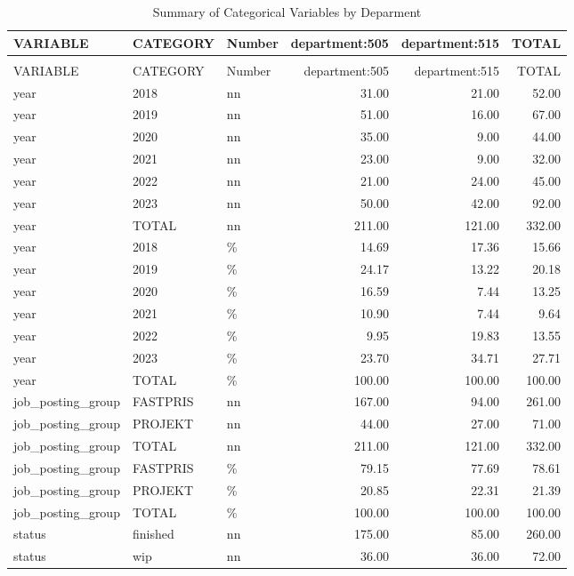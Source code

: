 \begingroup\fontsize{9}{11}\selectfont

\begin{longtable}[t]{lllrrr}
\caption{Summary of Categorical Variables by Deparment}\\
\toprule
VARIABLE & CATEGORY & Number & department:505 & department:515 & TOTAL\\
\midrule
\endfirsthead
\caption[]{Summary of Categorical Variables by Deparment }\\
\toprule
VARIABLE & CATEGORY & Number & department:505 & department:515 & TOTAL\\
\midrule
\endhead

\endfoot
\bottomrule
\endlastfoot
year & 2018 & nn & 31.00 & 21.00 & 52.00\\
year & 2019 & nn & 51.00 & 16.00 & 67.00\\
year & 2020 & nn & 35.00 & 9.00 & 44.00\\
year & 2021 & nn & 23.00 & 9.00 & 32.00\\
year & 2022 & nn & 21.00 & 24.00 & 45.00\\
year & 2023 & nn & 50.00 & 42.00 & 92.00\\
year & TOTAL & nn & 211.00 & 121.00 & 332.00\\
year & 2018 & \% & 14.69 & 17.36 & 15.66\\
year & 2019 & \% & 24.17 & 13.22 & 20.18\\
year & 2020 & \% & 16.59 & 7.44 & 13.25\\
year & 2021 & \% & 10.90 & 7.44 & 9.64\\
year & 2022 & \% & 9.95 & 19.83 & 13.55\\
year & 2023 & \% & 23.70 & 34.71 & 27.71\\
year & TOTAL & \% & 100.00 & 100.00 & 100.00\\
job\_posting\_group & FASTPRIS & nn & 167.00 & 94.00 & 261.00\\
job\_posting\_group & PROJEKT & nn & 44.00 & 27.00 & 71.00\\
job\_posting\_group & TOTAL & nn & 211.00 & 121.00 & 332.00\\
job\_posting\_group & FASTPRIS & \% & 79.15 & 77.69 & 78.61\\
job\_posting\_group & PROJEKT & \% & 20.85 & 22.31 & 21.39\\
job\_posting\_group & TOTAL & \% & 100.00 & 100.00 & 100.00\\
status & finished & nn & 175.00 & 85.00 & 260.00\\
status & wip & nn & 36.00 & 36.00 & 72.00\\

\end{longtable}
